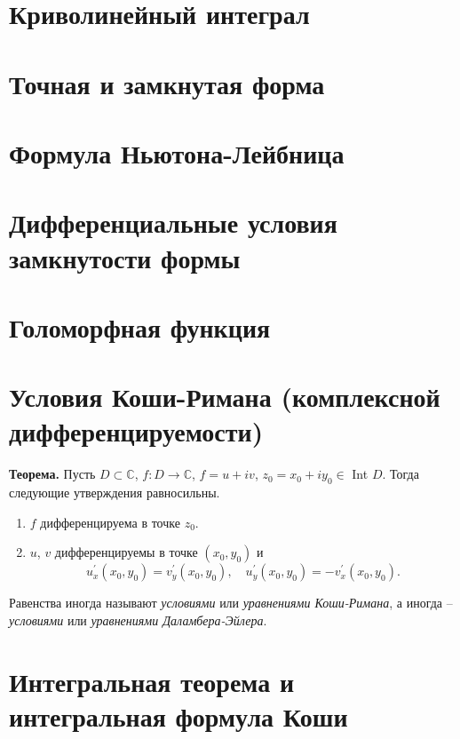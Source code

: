 \documentclass[16pt, letterpaper]{article}
\begin{document}
\section*{Криволинейный интеграл}

\section*{Точная и замкнутая форма}

\section*{Формула Ньютона-Лейбница}

\section*{Дифференциальные условия замкнутости формы}

\section*{Голоморфная функция}

\section*{Условия Коши-Римана (комплексной дифференцируемости)}
\textbf{Теорема.} Пусть $D \subset \mathbb{C}$, $f: D \to \mathbb{C}$, $f = u + iv$, $z_0 = x_0 + iy_0 \in$ Int $D$. Тогда следующие утверждения равносильны.
\begin{enumerate}
\item $f$ дифференцируема в точке $z_0$.
\item $u$, $v$ дифференцируемы в точке $(x_0, y_0)$ и  $$u_{x}^{'}(x_0, y_0) = v_{y}^{'}(x_0, y_0), \quad u_{y}^{'}(x_0, y_0) = -v_{x}^{'}(x_0, y_0).$$ 
\end{enumerate}
Равенства иногда называют \textit{условиями} или \textit{уравнениями Коши-Римана}, а иногда -- \textit{условиями} или \textit{уравнениями Даламбера-Эйлера}.

\section*{Интегральная теорема и интегральная формула Коши}
\end{document}
